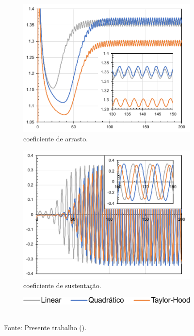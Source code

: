 \begin{figure}[h!]
    \centering
    \caption{Valores ao longo do tempo na simulação VMS de:}
    \begin{subfigure}{.49\textwidth}
        \centering
        \includegraphics[width=\linewidth]{Figuras/cylinder/analise2/VMS-drag.pdf}
        \caption{coeficiente de arrasto.}
    \end{subfigure}
    \begin{subfigure}{.49\textwidth}
        \centering
        \includegraphics[width=\linewidth]{Figuras/cylinder/analise2/VMS-lift.pdf}
        \caption{coeficiente de sustentação.}
    \end{subfigure}
    \begin{subfigure}{\textwidth}
        \centering
        \includegraphics[width=.4\linewidth]{Figuras/cylinder/analise2/legenda.pdf}
    \end{subfigure}
    \\Fonte: Presente trabalho (\the\year).
    \label{fig:cyl-draglift-VMS}
\end{figure}

